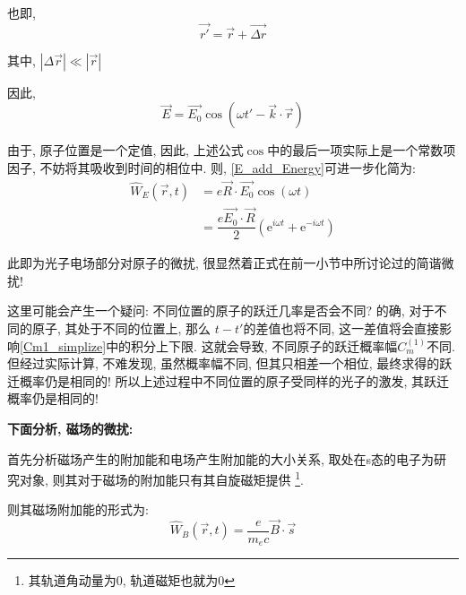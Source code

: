 \documentclass[a4paper, 11pt]{article}
\begin{document}
\begin{spacing}{1.2}
          也即, 
          \begin{equation}
            \vec{r'} = \vec{r} + \vec{\Delta{}r}
          \end{equation}

          其中, $|\Delta\vec{r}|\ll |\vec{r}|$

          因此, 
          \begin{equation}
            \vec{E} = \vec{E_0}\cos(\omega t'-\vec{k}\cdot\vec{r}) 
          \end{equation}

          由于, 原子位置是一个定值, 因此, 上述公式$\cos$中的最后一项实际上是一个常数项因子, 不妨将其吸收到时间的相位中.
          则, \eqref{E_add_Energy}可进一步化简为:      
          \begin{equation}
            \label{E_add_Energy_simple}
            \begin{aligned}
              \hat{W}_E(\vec{r},t) &= e\vec{R}\cdot\vec{E_0}\cos(\omega t)\\
                            &= \dfrac{e\vec{E_0}\cdot\vec{R}}{2}
                            (\mathrm{e}^{i\omega{}t}+\mathrm{e}^{-i\omega{}t})
            \end{aligned}
          \end{equation}
          
          此即为光子电场部分对原子的微扰, 很显然着正式在前一小节中所讨论过的简谐微扰!
          
          
          这里可能会产生一个疑问: 不同位置的原子的跃迁几率是否会不同? 
          的确, 对于不同的原子, 其处于不同的位置上, 那么
          $t-t'$的差值也将不同, 这一差值将会直接影响\eqref{Cm1_simplize}中的积分上下限. 
          这就会导致, 不同原子的跃迁概率幅$C_m^{(1)}$不同. 但经过实际计算, 不难发现, 虽然概率幅不同, 
          但其只相差一个相位, 最终求得的跃迁概率仍是相同的! 所以上述过程中不同位置的原子受同样的光子的激发,
          其跃迁概率仍是相同的!
          
          \textbf{下面分析, 磁场的微扰:}

          首先分析磁场产生的附加能和电场产生附加能的大小关系, 取处在s态的电子为研究对象, 则其对于磁场的附加能只有其自旋磁矩提供
          \footnote{其轨道角动量为0, 轨道磁矩也就为0}.

          则其磁场附加能的形式为:
          \begin{equation}
            \hat{W}_B(\vec{r}, t) = \frac{e}{m_ec}\vec{B}\cdot\vec{s}
          \end{equation}
     

\end{spacing}
\end{document}
